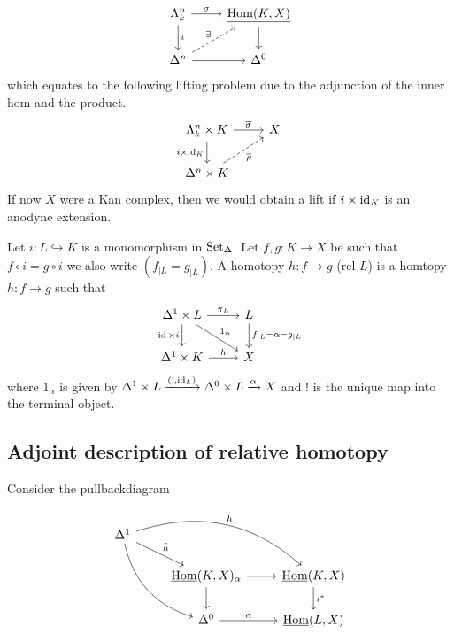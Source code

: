 \[
    \begin{tikzcd}
        \Lambda_k^n
        \ar[r,"\sigma"]
        \ar[d,"\iota"]
        &
        \underline{\Hom(K,X)}
        \ar[d]
        \\
        \Delta^n
        \ar[ur, dashed, "\exists"]
        \ar[r]
        &
        \Delta^0
    \end{tikzcd}
\]
which equates to the following lifting problem due to the adjunction of the inner hom and the product.
\[
\begin{tikzcd}
    \Lambda^n_k \times K
    \ar[r, " \overline{\sigma} "]
    \ar[d, " i \times \id_K"' ]
    &
    X
    \\
    \Delta^n \times K
    \ar[ru, dashed, " \overline{ \rho }"']
\end{tikzcd}
\]
If now $X$ were a Kan complex, then we would obtain a lift if $ i \times \operatorname{id}_K $ is an anodyne extension.

\begin{defi}
    Let $i\colon L \hookrightarrow K$ is a monomorphism in $\operatorname{Set}_{\Delta}$.
    Let $f,g \colon K \to X$ be such that $f \circ i = g \circ i$ we also write $(f_{\mid L}=g_{\mid L})$. A homotopy $h\colon f \to g $ (rel $L$) is a homtopy $h \colon f \to g$ such that 
    \[
    \begin{tikzcd}
        \Delta^1 \times L 
        \ar[r, "\pi_L"]
        \ar[dr,"1_{\alpha}"]
        \ar[d, "\id \times i"']
        &
        L
        \ar[d, "f_{\mid L} = \alpha = g_{\mid L}"]
        \\
        \Delta^1 \times K 
        \ar[r, "h"]
        &
        X
    \end{tikzcd}
    \]
    where $1_{\alpha}$ is given by $\Delta^1 \times L \xrightarrow{(!,\operatorname{id}_L)} \Delta^0 \times L \xrightarrow{\alpha}X$ and $!$ is the unique map into the terminal object.
\end{defi}

\subsection{Adjoint description of relative homotopy}

Consider the pullbackdiagram

\[
\begin{tikzcd}
    \Delta^1
    \ar[rd,"\Tilde{h}"]
    \ar[rrd,bend left,"h"]
    \ar[ddr, bend right]
    \\
    &
    \underline{\Hom}(K,X)_{\alpha}
    \ar[r]
    \ar[d]
    &
    \underline{\Hom}(K,X)
    \ar[d,"i^*"]
    \\
    &
    \Delta^0
    \ar[r,"\alpha"]
    &
    \underline{\Hom}(L,X)
\end{tikzcd}
\]

